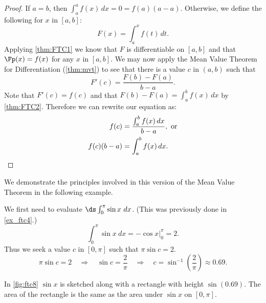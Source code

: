 \begin{proof}
If $a=b$, then $\int_a^a f(x)\,dx =0=f(a)(a-a)$. Otherwise, we define the following for $x$ in $[a,b]$:
\[ F(x)=\int_a^x f(t)\,dt.\]
Applying \autoref{thm:FTC1} we know that $F$ is differentiable on $[a,b]$ and that $\Fp(x)=f(x)$ for any $x$ in $[a,b]$. We may now apply the Mean Value Theorem for Differentiation (\autoref{thm:mvt}) to see that there is a value $c$ in $(a,b)$ such that
\[F'(c)=\frac{F(b)-F(a)}{b-a}.\]
Note that $F'(c)=f(c)$ and that $F(b)-F(a)=\int_a^b f(x)\,dx$ by \autoref{thm:FTC2}. Therefore we can rewrite our equation as: 
\begin{align*}
f(c)&=\frac{\int_a^b f(x)\,dx}{b-a},\text{ or}\\
f(c)(b-a)&=\int_a^b f(x)\,dx.\qedhere
\end{align*}
\end{proof}

We demonstrate the principles involved in this version of the Mean Value Theorem in the following example.


{We first need to evaluate $\ds\int_0^\pi \sin x\ dx$. (This was previously done in \autoref{ex_ftc4}.)
\[\int_0^\pi\sin x\ dx = -\cos x \Big|_0^\pi = 2.\]
Thus we seek a value $c$ in $[0,\pi]$ such that $\pi\sin c =2$. 
\[
 \pi\sin c = 2\quad \Rightarrow\quad
 \sin c =\frac2\pi\quad \Rightarrow\quad
 c = \sin^{-1}\left(\frac2\pi\right) \approx 0.69.
\]

In \autoref{fig:ftc8} $\sin x$ is sketched along with a rectangle with height $\sin (0.69)$. The area of the rectangle is the same as the area under $\sin x$ on $[0,\pi]$.}

